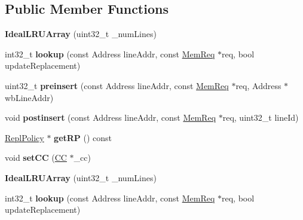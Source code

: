 \subsection*{Public Member Functions}
\begin{DoxyCompactItemize}
\item 
\hypertarget{classIdealLRUArray_af1a4102b2fef0241d63f0e801e89f2e1}{{\bfseries Ideal\-L\-R\-U\-Array} (uint32\-\_\-t \-\_\-num\-Lines)}\label{classIdealLRUArray_af1a4102b2fef0241d63f0e801e89f2e1}

\item 
\hypertarget{classIdealLRUArray_aee6f323e0bc32079036d7e4a9c6933a1}{int32\-\_\-t {\bfseries lookup} (const Address line\-Addr, const \hyperlink{structMemReq}{Mem\-Req} $\ast$req, bool update\-Replacement)}\label{classIdealLRUArray_aee6f323e0bc32079036d7e4a9c6933a1}

\item 
\hypertarget{classIdealLRUArray_a1bbd715a516bd619a7616278af19c835}{uint32\-\_\-t {\bfseries preinsert} (const Address line\-Addr, const \hyperlink{structMemReq}{Mem\-Req} $\ast$req, Address $\ast$wb\-Line\-Addr)}\label{classIdealLRUArray_a1bbd715a516bd619a7616278af19c835}

\item 
\hypertarget{classIdealLRUArray_a7bb8b248770283b7083a242d825ff795}{void {\bfseries postinsert} (const Address line\-Addr, const \hyperlink{structMemReq}{Mem\-Req} $\ast$req, uint32\-\_\-t line\-Id)}\label{classIdealLRUArray_a7bb8b248770283b7083a242d825ff795}

\item 
\hypertarget{classIdealLRUArray_ab4ed72c6342be5ff2e6c47bab63068ce}{\hyperlink{classReplPolicy}{Repl\-Policy} $\ast$ {\bfseries get\-R\-P} () const }\label{classIdealLRUArray_ab4ed72c6342be5ff2e6c47bab63068ce}

\item 
\hypertarget{classIdealLRUArray_a7dfad52e5897a8816334c038d103fd3a}{void {\bfseries set\-C\-C} (\hyperlink{classCC}{C\-C} $\ast$\-\_\-cc)}\label{classIdealLRUArray_a7dfad52e5897a8816334c038d103fd3a}

\item 
\hypertarget{classIdealLRUArray_af1a4102b2fef0241d63f0e801e89f2e1}{{\bfseries Ideal\-L\-R\-U\-Array} (uint32\-\_\-t \-\_\-num\-Lines)}\label{classIdealLRUArray_af1a4102b2fef0241d63f0e801e89f2e1}

\item 
\hypertarget{classIdealLRUArray_aee6f323e0bc32079036d7e4a9c6933a1}{int32\-\_\-t {\bfseries lookup} (const Address line\-Addr, const \hyperlink{structMemReq}{Mem\-Req} $\ast$req, bool update\-Replacement)}\label{classIdealLRUArray_aee6f323e0bc32079036d7e4a9c6933a1}


\end{DoxyCompactItemize}
